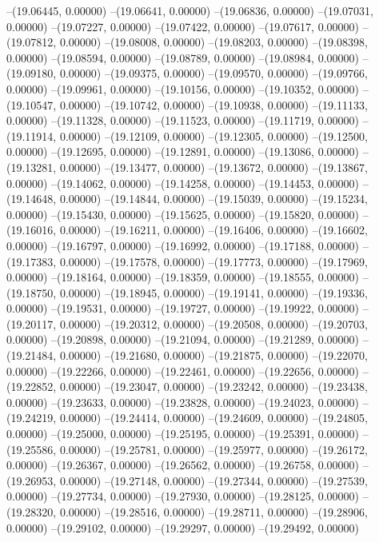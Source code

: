 --(19.06445, 0.00000)
--(19.06641, 0.00000)
--(19.06836, 0.00000)
--(19.07031, 0.00000)
--(19.07227, 0.00000)
--(19.07422, 0.00000)
--(19.07617, 0.00000)
--(19.07812, 0.00000)
--(19.08008, 0.00000)
--(19.08203, 0.00000)
--(19.08398, 0.00000)
--(19.08594, 0.00000)
--(19.08789, 0.00000)
--(19.08984, 0.00000)
--(19.09180, 0.00000)
--(19.09375, 0.00000)
--(19.09570, 0.00000)
--(19.09766, 0.00000)
--(19.09961, 0.00000)
--(19.10156, 0.00000)
--(19.10352, 0.00000)
--(19.10547, 0.00000)
--(19.10742, 0.00000)
--(19.10938, 0.00000)
--(19.11133, 0.00000)
--(19.11328, 0.00000)
--(19.11523, 0.00000)
--(19.11719, 0.00000)
--(19.11914, 0.00000)
--(19.12109, 0.00000)
--(19.12305, 0.00000)
--(19.12500, 0.00000)
--(19.12695, 0.00000)
--(19.12891, 0.00000)
--(19.13086, 0.00000)
--(19.13281, 0.00000)
--(19.13477, 0.00000)
--(19.13672, 0.00000)
--(19.13867, 0.00000)
--(19.14062, 0.00000)
--(19.14258, 0.00000)
--(19.14453, 0.00000)
--(19.14648, 0.00000)
--(19.14844, 0.00000)
--(19.15039, 0.00000)
--(19.15234, 0.00000)
--(19.15430, 0.00000)
--(19.15625, 0.00000)
--(19.15820, 0.00000)
--(19.16016, 0.00000)
--(19.16211, 0.00000)
--(19.16406, 0.00000)
--(19.16602, 0.00000)
--(19.16797, 0.00000)
--(19.16992, 0.00000)
--(19.17188, 0.00000)
--(19.17383, 0.00000)
--(19.17578, 0.00000)
--(19.17773, 0.00000)
--(19.17969, 0.00000)
--(19.18164, 0.00000)
--(19.18359, 0.00000)
--(19.18555, 0.00000)
--(19.18750, 0.00000)
--(19.18945, 0.00000)
--(19.19141, 0.00000)
--(19.19336, 0.00000)
--(19.19531, 0.00000)
--(19.19727, 0.00000)
--(19.19922, 0.00000)
--(19.20117, 0.00000)
--(19.20312, 0.00000)
--(19.20508, 0.00000)
--(19.20703, 0.00000)
--(19.20898, 0.00000)
--(19.21094, 0.00000)
--(19.21289, 0.00000)
--(19.21484, 0.00000)
--(19.21680, 0.00000)
--(19.21875, 0.00000)
--(19.22070, 0.00000)
--(19.22266, 0.00000)
--(19.22461, 0.00000)
--(19.22656, 0.00000)
--(19.22852, 0.00000)
--(19.23047, 0.00000)
--(19.23242, 0.00000)
--(19.23438, 0.00000)
--(19.23633, 0.00000)
--(19.23828, 0.00000)
--(19.24023, 0.00000)
--(19.24219, 0.00000)
--(19.24414, 0.00000)
--(19.24609, 0.00000)
--(19.24805, 0.00000)
--(19.25000, 0.00000)
--(19.25195, 0.00000)
--(19.25391, 0.00000)
--(19.25586, 0.00000)
--(19.25781, 0.00000)
--(19.25977, 0.00000)
--(19.26172, 0.00000)
--(19.26367, 0.00000)
--(19.26562, 0.00000)
--(19.26758, 0.00000)
--(19.26953, 0.00000)
--(19.27148, 0.00000)
--(19.27344, 0.00000)
--(19.27539, 0.00000)
--(19.27734, 0.00000)
--(19.27930, 0.00000)
--(19.28125, 0.00000)
--(19.28320, 0.00000)
--(19.28516, 0.00000)
--(19.28711, 0.00000)
--(19.28906, 0.00000)
--(19.29102, 0.00000)
--(19.29297, 0.00000)
--(19.29492, 0.00000)
